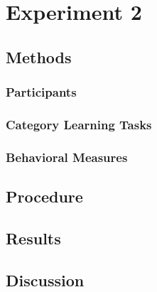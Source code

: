 \documentclass[../dissertation.tex]{subfiles}
\begin{document}
\section{Experiment 2}

\subsection{Methods}
\subsubsection{Participants}
\subsubsection{Category Learning Tasks}
\subsubsection{Behavioral Measures}
 
\subsection{Procedure}

\subsection{Results}

\subsection{Discussion}
\end{document}
